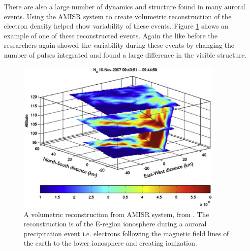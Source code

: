 There are also a large number of dynamics and structure found in many auroral events. Using the AMISR system to create volumetric reconstruction of the electron density \cite{Semeter2009738} helped show variability of these events. Figure \ref{fig:eregionact} shows an example of one of these reconstructed events.  Again the like before the researchers again showed the variability during these events by changing the number of pulses integrated and found a large difference in the visible structure.
\begin{figure}[!t]
\centering
\includegraphics[width=4.0in]{threedamisr}
\caption{A volumetric reconstruction from AMISR system, from \cite{Semeter2009738}. The reconstruction is of the E-region ionosphere during a auroral precipitation event i.e. electrons following the magnetic field lines of the earth to the lower ionosphere and creating ionization.}
\label{fig:eregionact}
\end{figure}
%
